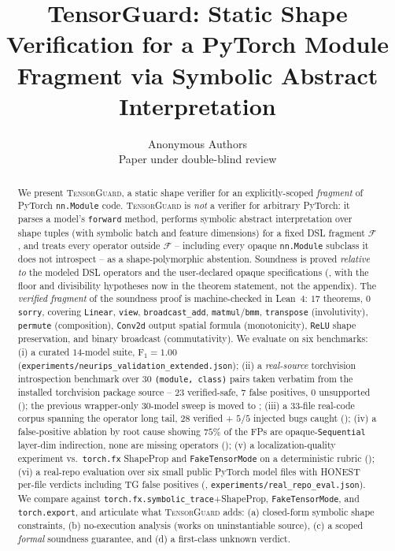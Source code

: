 \documentclass{article}
\title{TensorGuard: Static Shape Verification for a PyTorch
       Module Fragment via Symbolic Abstract Interpretation}
\author{%
  Anonymous Authors\\
  Paper under double-blind review
}
\date{}
\theoremstyle{definition}
\begin{document}
\maketitle

\begin{abstract}
We present \textsc{TensorGuard}, a static shape verifier for an
explicitly-scoped \emph{fragment} of PyTorch \verb|nn.Module| code.
\textsc{TensorGuard} is \emph{not} a verifier for arbitrary PyTorch:
it parses a model's \verb|forward| method, performs symbolic
abstract interpretation over shape tuples (with symbolic batch and
feature dimensions) for a fixed DSL fragment $\mathcal F$, and
treats every operator outside $\mathcal F$ -- including every
opaque \verb|nn.Module| subclass it does not introspect -- as a
shape-polymorphic abstention. Soundness is proved \emph{relative
to} the modeled DSL operators and the user-declared opaque
specifications (, with the floor and
divisibility hypotheses now in the theorem statement, not the
appendix). The \emph{verified fragment} of the soundness proof is
machine-checked in Lean~4: $17$ theorems, $0$ \texttt{sorry},
covering \texttt{Linear}, \texttt{view}, \texttt{broadcast\_add},
\texttt{matmul}/\texttt{bmm}, \texttt{transpose} (involutivity),
\texttt{permute} (composition), \texttt{Conv2d} output spatial
formula (monotonicity), \texttt{ReLU} shape preservation, and
binary broadcast (commutativity).
We evaluate on six benchmarks:
(i) a curated $14$-model suite, F$_1=1.00$
(\texttt{experiments/neurips\_validation\_extended.json});
(ii) a \emph{real-source} torchvision introspection benchmark over
$30$ \texttt{(module, class)} pairs taken verbatim from the
installed torchvision package source -- $23$ verified-safe, $7$
false positives, $0$ unsupported
(); the previous wrapper-only $30$-model
sweep is moved to ;
(iii) a $33$-file real-code corpus spanning the operator long tail,
$28$ verified + $5/5$ injected bugs caught
();
(iv) a false-positive ablation by root cause showing
$75\%$ of the FPs are opaque-\texttt{Sequential} layer-dim
indirection, none are missing operators
();
(v) a localization-quality experiment vs.\ \verb|torch.fx|
ShapeProp and \verb|FakeTensorMode| on a deterministic rubric
();
(vi) a real-repo evaluation over six small public PyTorch model
files with HONEST per-file verdicts including TG false positives
(, \texttt{experiments/real\_repo\_eval.json}).
We compare against
\verb|torch.fx.symbolic_trace|+ShapeProp, \verb|FakeTensorMode|,
and \verb|torch.export|, and articulate what \textsc{TensorGuard}
adds: (a) closed-form symbolic shape constraints,
(b) no-execution analysis (works on uninstantiable source),
(c) a scoped \emph{formal} soundness guarantee, and
(d) a first-class \textsf{unknown} verdict.
\end{abstract}
\end{document}
